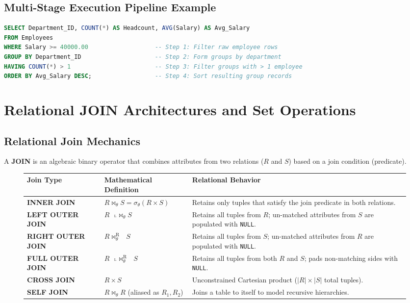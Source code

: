 \subsection{Multi-Stage Execution Pipeline Example}
\begin{lstlisting}[language=SQL]
SELECT Department_ID, COUNT(*) AS Headcount, AVG(Salary) AS Avg_Salary
FROM Employees
WHERE Salary >= 40000.00                   -- Step 1: Filter raw employee rows
GROUP BY Department_ID                     -- Step 2: Form groups by department
HAVING COUNT(*) > 1                        -- Step 3: Filter groups with > 1 employee
ORDER BY Avg_Salary DESC;                  -- Step 4: Sort resulting group records
\end{lstlisting}

\section{Relational JOIN Architectures and Set Operations}
\label{sec:dbms_sql_joins}

\subsection{Relational Join Mechanics}
A \textbf{JOIN} is an algebraic binary operator that combines attributes from two relations ($R$ and $S$) based on a join condition (predicate).

\begin{figure}[htbp]
\centering
\small
\begin{tabularx}{\textwidth}{l p{4.2cm} X}
\toprule
\textbf{Join Type} & \textbf{Mathematical Definition} & \textbf{Relational Behavior} \\
\midrule
\textbf{INNER JOIN} & $R \bowtie_{\theta} S = \sigma_{\theta}(R \times S)$ & Retains only tuples that satisfy the join predicate in both relations. \\
\textbf{LEFT OUTER JOIN} & $R \text{ } {}_{{}^{\text{L}}}\!\bowtie_{\theta} S$ & Retains all tuples from $R$; un-matched attributes from $S$ are populated with \texttt{NULL}. \\
\textbf{RIGHT OUTER JOIN} & $R \bowtie_{\theta}^{\text{R}}\text{ } S$ & Retains all tuples from $S$; un-matched attributes from $R$ are populated with \texttt{NULL}. \\
\textbf{FULL OUTER JOIN} & $R \text{ } {}_{{}^{\text{L}}}\!\bowtie_{\theta}^{\text{R}}\text{ } S$ & Retains all tuples from both $R$ and $S$; pads non-matching sides with \texttt{NULL}. \\
\textbf{CROSS JOIN} & $R \times S$ & Unconstrained Cartesian product ($|R| \times |S|$ total tuples). \\
\textbf{SELF JOIN} & $R \bowtie_{\theta} R$ (aliased as $R_1, R_2$) & Joins a table to itself to model recursive hierarchies. \\
\bottomrule
\end{tabularx}
\end{figure}

